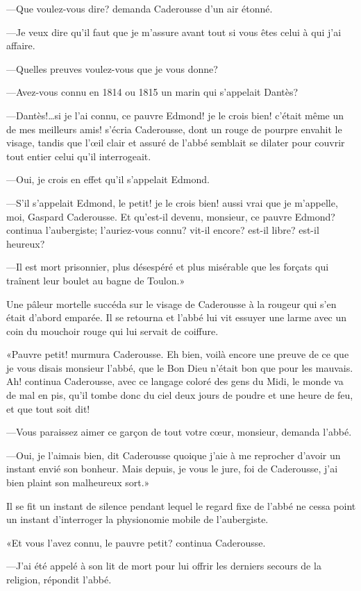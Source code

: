 —Que voulez-vous dire? demanda Caderousse d'un air étonné.

—Je veux dire qu'il faut que je m'assure avant tout si vous êtes celui à qui j'ai affaire.

—Quelles preuves voulez-vous que je vous donne?

—Avez-vous connu en 1814 ou 1815 un marin qui s'appelait Dantès?

—Dantès!\dots si je l'ai connu, ce pauvre Edmond! je le crois bien! c'était même un de mes meilleurs amis! s'écria Caderousse, dont un rouge de pourpre envahit le visage, tandis que l'œil clair et assuré de l'abbé semblait se dilater pour couvrir tout entier celui qu'il interrogeait.

—Oui, je crois en effet qu'il s'appelait Edmond.

—S'il s'appelait Edmond, le petit! je le crois bien! aussi vrai que je m'appelle, moi, Gaspard Caderousse. Et qu'est-il devenu, monsieur, ce pauvre Edmond? continua l'aubergiste; l'auriez-vous connu? vit-il encore? est-il libre? est-il heureux?

—Il est mort prisonnier, plus désespéré et plus misérable que les forçats qui traînent leur boulet au bagne de Toulon.»

Une pâleur mortelle succéda sur le visage de Caderousse à la rougeur qui s'en était d'abord emparée. Il se retourna et l'abbé lui vit essuyer une larme avec un coin du mouchoir rouge qui lui servait de coiffure.

«Pauvre petit! murmura Caderousse. Eh bien, voilà encore une preuve de ce que je vous disais monsieur l'abbé, que le Bon Dieu n'était bon que pour les mauvais. Ah! continua Caderousse, avec ce langage coloré des gens du Midi, le monde va de mal en pis, qu'il tombe donc du ciel deux jours de poudre et une heure de feu, et que tout soit dit!

—Vous paraissez aimer ce garçon de tout votre cœur, monsieur, demanda l'abbé.

—Oui, je l'aimais bien, dit Caderousse quoique j'aie à me reprocher d'avoir un instant envié son bonheur. Mais depuis, je vous le jure, foi de Caderousse, j'ai bien plaint son malheureux sort.»

Il se fit un instant de silence pendant lequel le regard fixe de l'abbé ne cessa point un instant d'interroger la physionomie mobile de l'aubergiste.

«Et vous l'avez connu, le pauvre petit? continua Caderousse.

—J'ai été appelé à son lit de mort pour lui offrir les derniers secours de la religion, répondit l'abbé.

